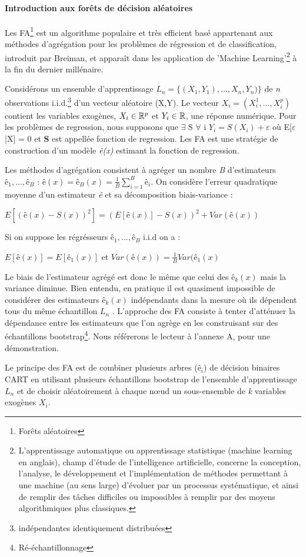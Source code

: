 	\paragraph{Introduction aux forêts de décision aléatoires\newline}
	Les FA\footnote{Forêts aléatoires} est un algorithme populaire et très efficient basé appartenant aux méthodes d'agrégation pour les problèmes de régression et de classification, introduit par Breiman\cite{BREI01}, et apparaît dans les application de 'Machine Learning'\footnote{L'apprentissage automatique ou apprentissage statistique (machine learning en anglais), champ d'étude de l'intelligence artificielle, concerne la conception, l'analyse, le développement et l'implémentation de méthodes permettant à une machine (au sens large) d'évoluer par un processus systématique, et ainsi de remplir des tâches difficiles ou impossibles à remplir par des moyens algorithmiques plus classiques.} à la fin du dernier millénaire\cite{DITRI99}.
	\par
	Considérons un ensemble d'apprentissage ${L_n = \{(X_1, Y_1),...,X_n, Y_n)\}}$ de \textit{n} observations i.i.d.\footnote{indépendantes identiquement distribuées} d'un vecteur aléatoire (X,Y). Le vecteur ${X_i = (X_i^1,...,X_i^p)}$ contient les variables exogènes, $X_i \in \mathbb{R}^p $ et $Y_i \in \mathbb{R} $, une réponse numérique. Pour les problèmes de regression, nous supposons que $ \exists$ S $\forall$ i $ Y_i=S(X_i)+\varepsilon$ où E[$\varepsilon$|X] = 0 et \textbf{S} est appellée fonction de regression. Les FA est une stratégie de construction d'un modèle \textit{ê(x)} estimant la fonction de regression.
	\par
	Les méthodes d’agrégation consistent à agréger un nombre \textit{B} d’estimateurs $ê_1,...,ê_\textit{B}$ : ${ê(x) = ê_B(x) =  \frac{1}{B} \sum_{i=1}^{B} ê_i}$. On considère l’erreur quadratique moyenne d’un estimateur \textit{ê} et sa décomposition biais-variance :
	\begin{center}
	${E[(ê(x)-S(x))^2] = (E[ê(x)] - S(x))^2 + Var(ê(x))}$
	\end{center}
	Si on suppose les régrésseurs $ê_1,...,ê_B$ i.i.d on a :
	\begin{center}
		$E[ê(x)] = E[ê_1(x)]$ et $Var(ê(x)) = \frac{1}{B} Var(ê_1(x)$
	\end{center}
	Le biais de l’estimateur agrégé est donc le même que celui des $ê_k(x)$ mais la variance diminue. Bien
	entendu, en pratique il est quasiment impossible de considérer des estimateurs $ê_k(x)$ indépendants
	dans la mesure où ils dépendent tous du même échantillon \textit{$L_n$} . L’approche des FA consiste à
	tenter d’atténuer la dépendance entre les estimateurs que l’on agrège en les construisant sur des
	échantillons bootstrap\footnote{Ré-échantillonnage}. Nous référerons le lecteur à l'annexe A, pour une démonstration.
	\par
	Le principe des FA est de combiner plusieurs arbres ($ê_i$) de décision binaires CART\cite{BREI84} en utilisant plusieurs échantillons bootstrap de l'ensemble d'apprentissage \textbf{$L_n$} et de choisir aléatoirement à chaque nœud un sous-ensemble de \textit{k} variables exogènes $X_i$.
	
